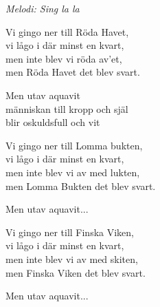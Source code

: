 {\footnotesize\textit{Melodi: Sing la la}}\par
\vspace{10pt}
Vi gingo ner till Röda Havet,\\
vi lågo i där minst en kvart,\\
men inte blev vi röda av’et,\\
men Röda Havet det blev svart.\par
\vspace{10pt}
\revrpt Men utav aquavit\\
människan till kropp och själ\\
blir oskuldsfull och vit\rpt\par
\vspace{10pt}
Vi gingo ner till Lomma bukten,\\
vi lågo i där minst en kvart,\\
men inte blev vi av med lukten,\\
men Lomma Bukten det blev svart.\par
\vspace{10pt}
Men utav aquavit...\par
\vspace{10pt}
Vi gingo ner till Finska Viken,\\
vi lågo i där minst en kvart,\\
men inte blev vi av med skiten,\\
men Finska Viken det blev svart.\par
\vspace{10pt}
Men utav aquavit...
